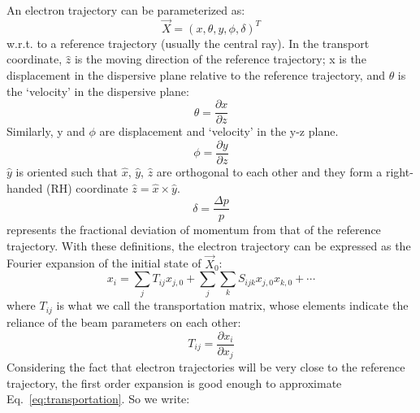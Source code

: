 An electron trajectory can be parameterized as: 
\begin{equation}
    \vec{X} = (x, \theta, y, \phi, \delta)^T
\end{equation}
w.r.t. to a reference trajectory (usually the central ray). In the transport coordinate, 
$\hat{z}$ is the moving direction of the reference trajectory;
x is the displacement in the dispersive plane relative to the reference 
trajectory, and $\theta$ is the `velocity' in the dispersive plane:
\begin{equation}
    \theta = \frac{\partial x}{\partial z}
\end{equation}
Similarly, y and $\phi$ are displacement and `velocity' in the y-z plane. 
\begin{equation}
    \phi = \frac{\partial y}{\partial z}
\end{equation}
$\hat{y}$ is oriented such that $\hat{x}$, $\hat{y}$, $\hat{z}$ are orthogonal 
to each other and they form a right-handed (RH) coordinate $\hat{z} = \hat{x} \times \hat{y}$.
\begin{equation}
    \delta = \frac{\Delta p}{p}
\end{equation}
represents the fractional deviation of momentum from that of the reference trajectory. 
With these definitions, the electron trajectory can be expressed
as the Fourier expansion of the initial state of $\vec{X}_0$:
\begin{equation}
    x_i = \sum_j T_{ij} x_{j,0} + \sum_j \sum_k S_{ijk} x_{j,0}x_{k, 0} + \cdots
    \label{eq:transportation}
\end{equation}
where $T_{ij}$ is what we call the transportation matrix, whose elements indicate
the reliance of the beam parameters on each other: 
\begin{equation}
    T_{ij} = \frac{\partial x_i}{\partial x_j}
\end{equation}
Considering the fact that electron trajectories will be very close to the 
reference trajectory, the first order expansion is good enough to approximate 
Eq.~\ref{eq:transportation}. So we write:
